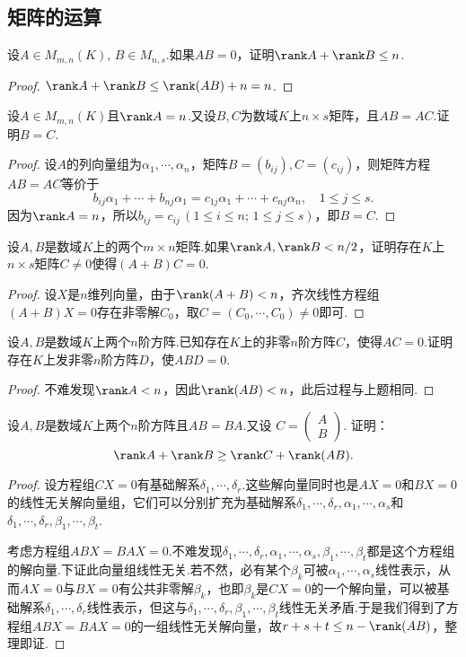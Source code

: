 \subsection{矩阵的运算}
\begin{prob}[7]
	设$A\in M_{m,n}(K),\,B\in M_{n,s}$.如果$AB=0$，证明$\rank A+\rank B\le n$.
\end{prob}
\begin{proof}
	$\rank A+\rank B\le \rank(AB)+n=n$.
\end{proof}
\begin{prob}[8]
	设$A\in M_{m,n}(K)$且$\rank A=n$.又设$B,C$为数域$K$上$n\times s$矩阵，且$AB=AC$.证明$B=C$.
\end{prob}
\begin{proof}
	设$A$的列向量组为$\alpha_1,\cdots,\alpha_n$，矩阵$B=(b_{ij}),C=(c_{ij})$，则矩阵方程$AB=AC$等价于
	\[
		b_{ij}\alpha_1+\cdots+b_{nj}\alpha_1=c_{1j}\alpha_1+\cdots+c_{nj}\alpha_n,\quad 1\le j\le s.
	\]
	因为$\rank A=n$，所以$b_{ij}=c_{ij}\,(1\le i\le n;\,1\le j\le s)$，即$B=C$.
\end{proof}
\begin{prob}[10]
	设$A,B$是数域$K$上的两个$m\times n$矩阵.如果$\rank A,\rank B<n/2$，证明存在$K$上$n\times s$矩阵$C\ne0$使得$(A+B)C=0$.
\end{prob}
\begin{proof}
	设$X$是$n$维列向量，由于$\rank(A+B)<n$，齐次线性方程组$(A+B)X=0$存在非零解$C_0$，取$C=(C_0,\cdots,C_0)\ne0$即可.
\end{proof}
\begin{prob}[11]
	设$A,B$是数域$K$上两个$n$阶方阵.已知存在$K$上的非零$n$阶方阵$C$，使得$AC=0$.证明存在$K$上发非零$n$阶方阵$D$，使$ABD=0$.
\end{prob}
\begin{proof}
	不难发现$\rank A<n$，因此$\rank(AB)<n$，此后过程与上题相同.
\end{proof}
\begin{prob}[12]
	设$A,B$是数域$K$上两个$n$阶方阵且$AB=BA$.又设
	$C=\begin{pmatrix}A\\B\end{pmatrix}$.
	证明：
	\[
		\rank A+\rank B\ge\rank C+\rank(AB).
	\]
\end{prob}
\begin{proof}
	设方程组$CX=0$有基础解系$\delta_1,\cdots,\delta_r$.这些解向量同时也是$AX=0$和$BX=0$的线性无关解向量组，它们可以分别扩充为基础解系$\delta_1,\cdots,\delta_r,\alpha_1,\cdots,\alpha_s$和$\delta_1,\cdots,\delta_r,\beta_1,\cdots,\beta_t$.

	考虑方程组$ABX=BAX=0$.不难发现$\delta_1,\cdots,\delta_r,\alpha_1,\cdots,\alpha_s,\beta_1,\cdots,\beta_t$都是这个方程组的解向量.下证此向量组线性无关.若不然，必有某个$\beta_k$可被$\alpha_1,\cdots,\alpha_s$线性表示，从而$AX=0$与$BX=0$有公共非零解$\beta_k$，也即$\beta_k$是$CX=0$的一个解向量，可以被基础解系$\delta_1,\cdots,\delta_r$线性表示，但这与$\delta_1,\cdots,\delta_r,\beta_1,\cdots,\beta_t$线性无关矛盾.于是我们得到了方程组$ABX=BAX=0$的一组线性无关解向量，故$r+s+t\le n-\rank(AB)$，整理即证.
\end{proof}

